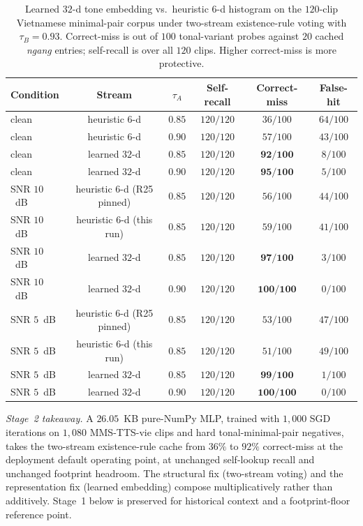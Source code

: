 \documentclass[a4paper,fleqn]{cas-dc}
\begin{document}
\begin{table}[h]
\caption{Learned $32$-d tone embedding vs.\ heuristic 6-d histogram on the $120$-clip Vietnamese minimal-pair corpus under two-stream existence-rule voting with $\tau_B = 0.93$. Correct-miss is out of $100$ tonal-variant probes against $20$ cached \emph{ngang} entries; self-recall is over all $120$ clips. Higher correct-miss is more protective.}\label{tab:learned_tone_stream}
\centering\footnotesize
\begin{tabular}{lccccc}
\toprule
Condition & Stream & $\tau_A$ & Self-recall & Correct-miss & False-hit \\
\midrule
clean       & heuristic 6-d  & $0.85$ & $120/120$ & $36/100$ & $64/100$ \\
clean       & heuristic 6-d  & $0.90$ & $120/120$ & $57/100$ & $43/100$ \\
\rowcolor{gray!10} clean       & learned $32$-d & $0.85$ & $120/120$ & $\mathbf{92/100}$ & $8/100$ \\
\rowcolor{gray!10} clean       & learned $32$-d & $0.90$ & $120/120$ & $\mathbf{95/100}$ & $5/100$ \\
SNR $10$~dB & heuristic 6-d (R25 pinned)  & $0.85$ & $120/120$ & $56/100$ & $44/100$ \\
SNR $10$~dB & heuristic 6-d (this run)   & $0.85$ & $120/120$ & $59/100$ & $41/100$ \\
\rowcolor{gray!10} SNR $10$~dB & learned $32$-d & $0.85$ & $120/120$ & $\mathbf{97/100}$ & $3/100$ \\
\rowcolor{gray!10} SNR $10$~dB & learned $32$-d & $0.90$ & $120/120$ & $\mathbf{100/100}$ & $0/100$ \\
SNR $5$~dB  & heuristic 6-d (R25 pinned)  & $0.85$ & $120/120$ & $53/100$ & $47/100$ \\
SNR $5$~dB  & heuristic 6-d (this run)    & $0.85$ & $120/120$ & $51/100$ & $49/100$ \\
\rowcolor{gray!10} SNR $5$~dB  & learned $32$-d & $0.85$ & $120/120$ & $\mathbf{99/100}$ & $1/100$ \\
\rowcolor{gray!10} SNR $5$~dB  & learned $32$-d & $0.90$ & $120/120$ & $\mathbf{100/100}$ & $0/100$ \\
\bottomrule
\end{tabular}
\end{table}

\noindent\textit{Stage~2 takeaway.} A $26.05$~KB pure-NumPy MLP, trained with $1{,}000$ SGD iterations on $1{,}080$ MMS-TTS-vie clips and hard tonal-minimal-pair negatives, takes the two-stream existence-rule cache from $36\%$ to $92\%$ correct-miss at the deployment default operating point, at unchanged self-lookup recall and unchanged footprint headroom. The structural fix (two-stream voting) and the representation fix (learned embedding) compose multiplicatively rather than additively. Stage~1 below is preserved for historical context and a footprint-floor reference point.
\end{document}
